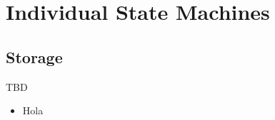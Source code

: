 
\section{Individual State Machines}

\subsection{Storage}


\begin{frame}{TBD}
\begin{itemize}
\item Hola
\end{itemize}
\end{frame}



